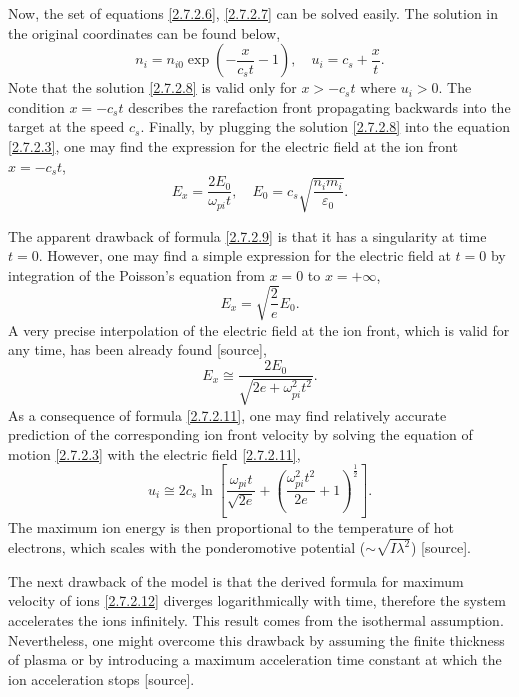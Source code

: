 Now, the set of equations \ref{2.7.2.6}, \ref{2.7.2.7} can be solved easily. The solution in the original coordinates can be found below,
\begin{equation}
\label{2.7.2.8}
n_i = n_{i0} \exp \left( -\frac{x}{c_s t} - 1 \right), \quad u_i = c_s + \frac{x}{t}.
\end{equation}
Note that the solution \ref{2.7.2.8} is valid only for $ x > -c_s t $ where $ u_i > 0 $. The condition $ x = - c_s t $ describes the rarefaction front propagating backwards into the target at the speed $ c_s $. Finally, by plugging the solution \ref{2.7.2.8} into the equation \ref{2.7.2.3}, one may find the expression for the electric field at the ion front $ x = - c_s t $,
\begin{equation}
\label{2.7.2.9}
E_x = \frac{2 E_0}{\omega_{pi} t}, \quad E_0 = c_s \sqrt{\frac{n_i m_i}{\varepsilon_0}}.
\end{equation}

The apparent drawback of formula \ref{2.7.2.9} is that it has a singularity at time $ t = 0 $. However, one may find a simple expression for the electric field at $ t = 0 $ by integration of the Poisson's equation from $ x = 0 $ to $ x = +\infty $,
\begin{equation}
\label{2.7.2.10}
E_x = \sqrt{\frac{2}{e}} E_0.
\end{equation}
A very precise interpolation of the electric field at the ion front, which is valid for any time, has been already found [source],
\begin{equation}
\label{2.7.2.11}
E_x \cong \frac{2 E_0}{\sqrt{2e + \omega_{pi}^2 t^2}}.
\end{equation}
As a consequence of formula \ref{2.7.2.11}, one may find relatively accurate prediction of the corresponding ion front velocity by solving the equation of motion \ref{2.7.2.3} with the electric field \ref{2.7.2.11},
\begin{equation}
\label{2.7.2.12}
u_i \cong 2 c_s \ln \left[ \frac{\omega_{pi} t}{\sqrt{2 e}} + \left(\frac{\omega_{pi}^2 t^2}{2 e} + 1 \right)^{\frac{1}{2}} \right].
\end{equation}
The maximum ion energy is then proportional to the temperature of hot electrons, which scales with the ponderomotive potential ($ \sim \sqrt{I \lambda^2} $) [source].

The next drawback of the model is that the derived formula for maximum velocity of ions \ref{2.7.2.12} diverges logarithmically with time, therefore the system accelerates the ions infinitely. This result comes from the isothermal assumption. Nevertheless, one might overcome this drawback by assuming the finite thickness of plasma or by introducing a maximum acceleration time constant at which the ion acceleration stops [source].